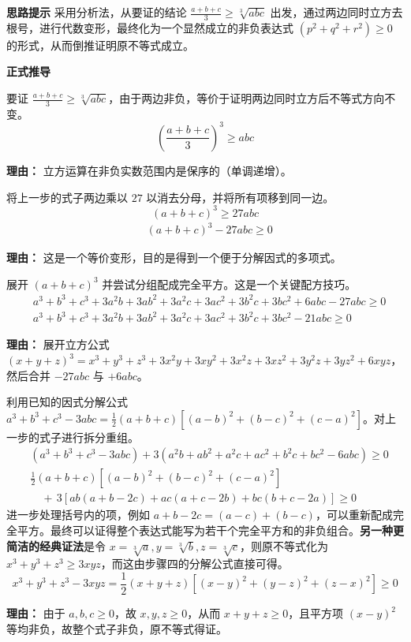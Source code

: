 \begin{proofbox}
\textbf{\textcolor{CProof}{思路提示}}
采用分析法，从要证的结论 $\frac{a+b+c}{3} \ge \sqrt[3]{abc}$ 出发，通过两边同时立方去根号，进行代数变形，最终化为一个显然成立的非负表达式 $(p^2+q^2+r^2) \ge 0$ 的形式，从而倒推证明原不等式成立。

\medskip
\textbf{\textcolor{CProof}{正式推导}}
\begin{description}[style=nextline, leftmargin=2.8em, labelsep=0.5em, itemsep=0.55em]
    \item[\textbf{步骤一（去根号立方）：}] 要证 $\frac{a+b+c}{3} \ge \sqrt[3]{abc}$，由于两边非负，等价于证明两边同时立方后不等式方向不变。
    \[
    \left(\frac{a+b+c}{3}\right)^3 \ge abc
    \]
    \par\textbf{理由：} 立方运算在非负实数范围内是保序的（单调递增）。

    \item[\textbf{步骤二（通分移项）：}] 将上一步的式子两边乘以 $27$ 以消去分母，并将所有项移到同一边。
    \[
    (a+b+c)^3 \ge 27abc
    \]
    \[
    \begin{aligned}
    &(a+b+c)^3 - 27abc \ge 0
    \end{aligned}
    \]
    \par\textbf{理由：} 这是一个等价变形，目的是得到一个便于分解因式的多项式。

    \item[\textbf{步骤三（展开并配方）：}] 展开 $(a+b+c)^3$ 并尝试分组配成完全平方。这是一个关键配方技巧。
    \[
    \begin{aligned}
    & a^3 + b^3 + c^3 + 3a^2b + 3ab^2 + 3a^2c + 3ac^2 + 3b^2c + 3bc^2 + 6abc - 27abc \ge 0 \\
    & a^3 + b^3 + c^3 + 3a^2b + 3ab^2 + 3a^2c + 3ac^2 + 3b^2c + 3bc^2 - 21abc \ge 0
    \end{aligned}
    \]
    \par\textbf{理由：} 展开立方公式 $(x+y+z)^3 = x^3+y^3+z^3+3x^2y+3xy^2+3x^2z+3xz^2+3y^2z+3yz^2+6xyz$，然后合并 $-27abc$ 与 $+6abc$。

    \item[\textbf{步骤四（巧用因式分解）：}] 利用已知的因式分解公式 $a^3+b^3+c^3-3abc = \frac{1}{2}(a+b+c)[(a-b)^2+(b-c)^2+(c-a)^2]$。对上一步的式子进行拆分重组。
    \[
    \begin{aligned}
    &(a^3+b^3+c^3 - 3abc) + 3(a^2b+ab^2+a^2c+ac^2+b^2c+bc^2 - 6abc) \ge 0 \\
    & \frac{1}{2}(a+b+c)[(a-b)^2+(b-c)^2+(c-a)^2] \\
    & \quad +\, 3[ab(a+b-2c)+ac(a+c-2b)+bc(b+c-2a)] \ge 0
    \end{aligned}
    \]
    进一步处理括号内的项，例如 $a+b-2c = (a-c)+(b-c)$，可以重新配成完全平方。最终可以证得整个表达式能写为若干个完全平方和的非负组合。\textbf{另一种更简洁的经典证法}是令 $x=\sqrt[3]{a}, y=\sqrt[3]{b}, z=\sqrt[3]{c}$，则原不等式化为 $x^3+y^3+z^3 \ge 3xyz$，而这由步骤四的分解公式直接可得。
    \[
    x^3+y^3+z^3 - 3xyz = \frac{1}{2}(x+y+z)[(x-y)^2+(y-z)^2+(z-x)^2] \ge 0
    \]
    \par\textbf{理由：} 由于 $a,b,c \ge 0$，故 $x,y,z \ge 0$，从而 $x+y+z \ge 0$，且平方项 $(x-y)^2$ 等均非负，故整个式子非负，原不等式得证。
\end{description}


\end{proofbox}
